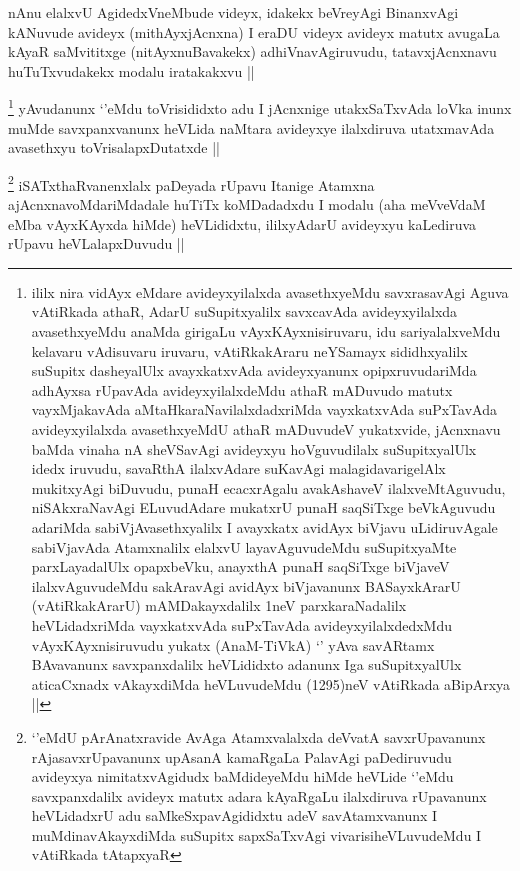 
\begin{artha}
nAnu elalxvU AgidedxVneMbude videyx, idakekx beVreyAgi BinanxvAgi kANuvude avideyx (mithAyxjAcnxna) I eraDU videyx avideyx matutx avugaLa kAyaR saMvititxge (nitAyxnuBavakekx) adhiVnavAgiruvudu, tatavxjAcnxnavu huTuTxvudakekx modalu iratakakxvu ||
\end{artha}


\begin{artha}
\footnote{ililx nira vidAyx eMdare avideyxyilalxda avasethxyeMdu savxrasavAgi Aguva vAtiRkada athaR, AdarU suSupitxyalilx savxcavAda avideyxyilalxda avasethxyeMdu anaMda girigaLu vAyxKAyxnisiruvaru, idu sariyalalxveMdu kelavaru vAdisuvaru iruvaru, vAtiRkakAraru neYSamayx sididhxyalilx suSupitx dasheyalUlx avayxkatxvAda avideyxyanunx opipxruvudariMda adhAyxsa rUpavAda avideyxyilalxdeMdu athaR mADuvudo matutx vayxMjakavAda aMtaHkaraNavilalxdadxriMda vayxkatxvAda suPxTavAda avideyxyilalxda avasethxyeMdU athaR mADuvudeV yukatxvide, jAcnxnavu baMda vinaha nA sheVSavAgi avideyxyu hoVguvudilalx suSupitxyalUlx idedx iruvudu, savaRthA ilalxvAdare suKavAgi malagidavarigelAlx mukitxyAgi biDuvudu, punaH ecacxrAgalu avakAshaveV ilalxveMtAguvudu, niSAkxraNavAgi ELuvudAdare mukatxrU punaH saqSiTxge beVkAguvudu adariMda sabiVjAvasethxyalilx I avayxkatx avidAyx biVjavu uLidiruvAgale sabiVjavAda Atamxnalilx elalxvU layavAguvudeMdu suSupitxyaMte parxLayadalUlx opapxbeVku, anayxthA punaH saqSiTxge biVjaveV ilalxvAguvudeMdu sakAravAgi avidAyx biVjavanunx BASayxkArarU (vAtiRkakArarU) mAMDakayxdalilx 1neV parxkaraNadalilx heVLidadxriMda vayxkatxvAda suPxTavAda avideyxyilalxdedxMdu vAyxKAyxnisiruvudu yukatx (AnaM-TiVkA) `\stext' yAva savARtamx BAvavanunx savxpanxdalilx heVLididxto adanunx Iga suSupitxyalUlx aticaCxnadx vAkayxdiMda heVLuvudeMdu (1295)neV vAtiRkada aBipArxya ||}
yAvudanunx `\stext'eMdu toVrisididxto adu I jAcnxnige utakxSaTxvAda loVka inunx muMde savxpanxvanunx heVLida naMtara avideyxye ilalxdiruva utatxmavAda avasethxyu toVrisalapxDutatxde ||
\end{artha}


\begin{artha}
\footnote{`\stext'eMdU pArAnatxravide AvAga Atamxvalalxda deVvatA savxrUpavanunx rAjasavxrUpavanunx upAsanA kamaRgaLa PalavAgi paDediruvudu avideyxya nimitatxvAgidudx baMdideyeMdu hiMde heVLide `\stext'eMdu savxpanxdalilx avideyx matutx adara kAyaRgaLu ilalxdiruva rUpavanunx heVLidadxrU adu saMkeSxpavAgididxtu adeV savAtamxvanunx I muMdinavAkayxdiMda suSupitx sapxSaTxvAgi vivarisiheVLuvudeMdu I vAtiRkada tAtapxyaR} 
iSATxthaRvanenxlalx paDeyada rUpavu Itanige Atamxna ajAcnxnavoMdariMdadale huTiTx koMDadadxdu I modalu (aha meVveVdaM eMba vAyxKAyxda hiMde) heVLididxtu, ililxyAdarU avideyxyu kaLediruva rUpavu heVLalapxDuvudu ||
\end{artha}


